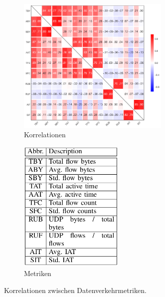\documentclass[12pt, a4paper]{article}
\begin{document}
\begin{appendix}
\begin{figure}[H]
    \centering
    \begin{subfigure}[b]{0.45\textwidth}
        \includegraphics[width=0.8\textwidth]{img/traffic_correlations.png}
        \caption{Korrelationen \cite{Alipour2018}}
    \end{subfigure}
    \hfill
    \begin{subfigure}[b]{0.45\textwidth}
        \includegraphics[width=0.55\textwidth]{img/traffic_metrics.png}
        \caption{Metriken \cite{Alipour2018}}
    \end{subfigure}
    \caption{Korrelationen zwischen Datenverkehrmetriken.}
    \label{fig:traffic_correlations}
\end{figure}


\end{appendix}
\end{document}
